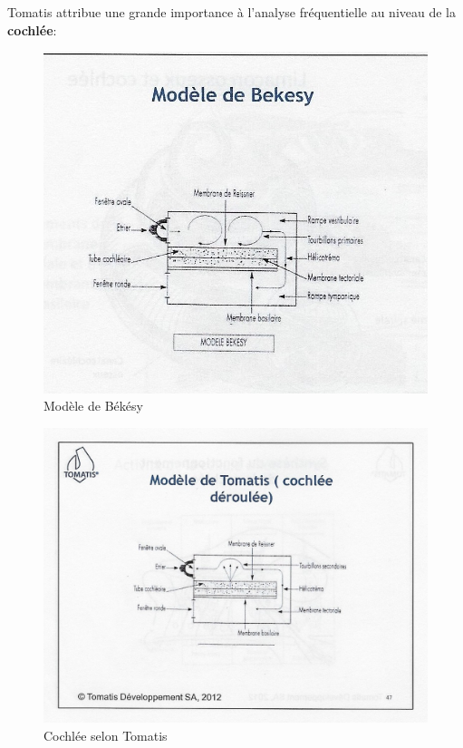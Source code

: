  Tomatis attribue une grande importance à l'analyse
          fréquentielle au niveau de la\textbf{ cochlée}: 
\begin{figure}
	\centering
	\includegraphics[width=0.7\linewidth]{images/Cochleederoule_bas.jpg}
	\caption[Modèle de Békésy]{Modèle de Békésy}
	\label{fig:cochleederoulebas}
\end{figure}


 \begin{figure}
	\centering
	\includegraphics[width=0.7\linewidth]{images/Cochleederoule_haut.jpg}
	\caption[Cochlée selon Tomatis]{Cochlée selon Tomatis}
	\label{fig:cochleederoulehaut}
      \end{figure}

